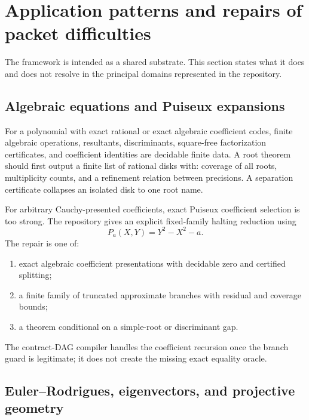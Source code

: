 \section{Application patterns and repairs of packet difficulties}

The framework is intended as a shared substrate.  This section states what it
does and does not resolve in the principal domains represented in the
repository.

\subsection{Algebraic equations and Puiseux expansions}

For a polynomial with exact rational or exact algebraic coefficient codes,
finite algebraic operations, resultants, discriminants, square-free
factorization certificates, and coefficient identities are decidable finite
data.  A root theorem should first output a finite list of rational disks with:
coverage of all roots, multiplicity counts, and a refinement relation between
precisions.  A separation certificate collapses an isolated disk to one root
name.

For arbitrary Cauchy-presented coefficients, exact Puiseux coefficient
selection is too strong.  The repository gives an explicit fixed-family
halting reduction using
\[
       P_a(X,Y)=Y^2-X^2-a.
\]
The repair is one of:
\begin{enumerate}[label=(\alph*)]
\item exact algebraic coefficient presentations with decidable zero and
      certified splitting;
\item a finite family of truncated approximate branches with residual and
      coverage bounds;
\item a theorem conditional on a simple-root or discriminant gap.
\end{enumerate}
The contract-DAG compiler handles the coefficient recursion once the branch
guard is legitimate; it does not create the missing exact equality oracle.

\subsection{Euler--Rodrigues, eigenvectors, and projective geometry}

